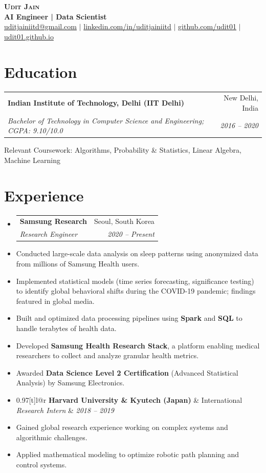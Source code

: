 \documentclass[a4paper,10pt]{article}
\makeatletter
\newcommand{\resumeItem}[1]{
  \item\small{#1 \vspace{-2pt}}
}
\newcommand{\resumeSubheading}[4]{
  \vspace{-1pt}\item
    \begin{tabular*}{0.97\textwidth}[t]{l@{\extracolsep{\fill}}r}
      \textbf{#1} & #2 \\
      \textit{\small#3} & \textit{\small #4} \\
    \end{tabular*}\vspace{-5pt}
}
\makeatother
\begin{document}
\begin{center}
    \textbf{\Huge \scshape Udit Jain} \\ \vspace{4pt}
    \textbf{AI Engineer | Data Scientist} \\ \vspace{4pt}
    \small \href{mailto:uditjainiitd@gmail.com}{uditjainiitd@gmail.com} $|$
    \href{https://www.linkedin.com/in/uditjainiitd/}{linkedin.com/in/uditjainiitd} $|$
    \href{https://github.com/udit01}{github.com/udit01} $|$
    \href{https://udit01.github.io}{udit01.github.io}
\end{center}


\section{Education}
  \resumeSubheading
    {Indian Institute of Technology, Delhi (IIT Delhi)}{New Delhi, India}
    {Bachelor of Technology in Computer Science and Engineering; CGPA: 9.10/10.0}{2016 -- 2020}
    \resumeItem{Relevant Coursework: Algorithms, Probability \& Statistics, Linear Algebra, Machine Learning}


\section{Experience}
  \begin{itemize}[leftmargin=0.15in, label={}]
  
    \resumeSubheading
      {Samsung Research}{Seoul, South Korea}
      {Research Engineer}{2020 -- Present}
      \resumeItem{Conducted large-scale data analysis on sleep patterns using anonymized data from millions of Samsung Health users.}
      \resumeItem{Implemented statistical models (time series forecasting, significance testing) to identify global behavioral shifts during the COVID-19 pandemic; findings featured in global media.}
      \resumeItem{Built and optimized data processing pipelines using \textbf{Spark} and \textbf{SQL} to handle terabytes of health data.}
      \resumeItem{Developed \textbf{Samsung Health Research Stack}, a platform enabling medical researchers to collect and analyze granular health metrics.}
      \resumeItem{Awarded \textbf{Data Science Level 2 Certification} (Advanced Statistical Analysis) by Samsung Electronics.}

    \resumeSubheading
      {Harvard University & Kyutech (Japan)}{International}
      {Research Intern}{2018 -- 2019}
      \resumeItem{Gained global research experience working on complex systems and algorithmic challenges.}
      \resumeItem{Applied mathematical modeling to optimize robotic path planning and control systems.}

  \end{itemize}
\end{document}
